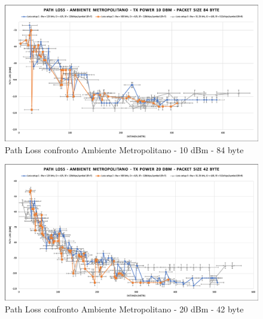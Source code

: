 \documentclass[12pt,a4paper,openright,twoside]{report}
\begin{document}
\begin{figure}[h]                      
\begin{center} 
\includegraphics[width=\textwidth]{PATH_LOSS_confronto_AM_10dBm_84byte.png}
\caption[Path Loss confronto Ambiente Metropolitano - 10 dBm - 84 byte]{Path Loss confronto Ambiente Metropolitano - 10 dBm - 84 byte}\label{fig:prima}
\end{center}
\end{figure}

\begin{figure}[h]                      
\begin{center} 
\includegraphics[width=\textwidth]{PATH_LOSS_confronto_AM_20dBm_42byte.png}
\caption[Path Loss confronto Ambiente Metropolitano - 20 dBm - 42 byte]{Path Loss confronto Ambiente Metropolitano - 20 dBm - 42 byte}\label{fig:prima}
\end{center}
\end{figure}
\end{document}
